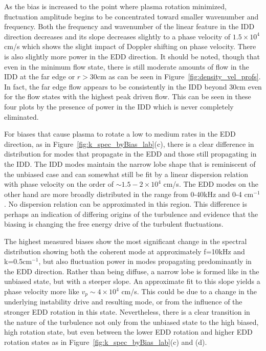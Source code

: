 \documentclass[aip,pop,amsmath,amssymb,reprint,superscriptaddress]{revtex4-1} %
\begin{document}
As the bias is increased to the point where plasma rotation minimized, fluctuation amplitude begins to be concentrated toward smaller wavenumber and frequency. Both the frequency and wavenumber of the linear feature in the IDD direction decreases and its slope decreases slightly to a phase velocity of $1.5 \times 10^{4}$ cm/s which shows the slight impact of Doppler shifting on phase velocity. There is also slightly more power in the EDD direction. It should be noted, though that even in the minimum flow state, there is still moderate amounts of flow in the IDD at the far edge or $r>30$cm as can be seen in Figure~\ref{fig:density_vel_profs}. In fact, the far edge flow appears to be consistently in the IDD beyond 30cm even for the flow states with the highest peak driven flow. This can be seen in these four plots by the presence of power in the IDD which is never completely eliminated. 

For biases that cause plasma to rotate a low to medium rates in the EDD direction, as in Figure~\ref{fig:k_spec_byBias_lab}(c), there is a clear difference in distribution for modes that propagate in the EDD and those still propagating in the IDD. The IDD modes maintain the narrow lobe shape that is reminiscent of the unbiased case and can somewhat still be fit by a linear dispersion relation with phase velocity on the order of $\sim 1.5-2 \times 10^{4}$ cm/s. The EDD modes on the other hand are more broadly distributed in the range from 0-40kHz and 0-4 $\text{cm}^{-1}$. No dispersion relation can be approximated in this region. This difference is perhaps an indication of differing origins of the turbulence and evidence that the biasing is changing the free energy drive of the turbulent fluctuations. 

The highest measured biases show the most significant change in the spectral distribution showing both the coherent mode at approximately f=10kHz and k=0.5$\text{cm}^{-1}$, but also fluctuation power in modes propagating predominantly in the EDD direction. Rather than being diffuse, a narrow lobe is formed like in the unbiased state, but with a steeper slope. An approximate fit to this slope yields a phase velocity more like $v_{p} \sim 4 \times 10^{4}$ cm/s. This could be due to a change in the underlying instability drive and resulting mode, or from the influence of the stronger EDD rotation in this state. Nevertheless, there is a clear transition in the nature of the turbulence not only from the unbiased state to the high biased, high rotation state, but even between the lower EDD rotation and higher EDD rotation states as in Figure~\ref{fig:k_spec_byBias_lab}(c) and (d).
\end{document}
